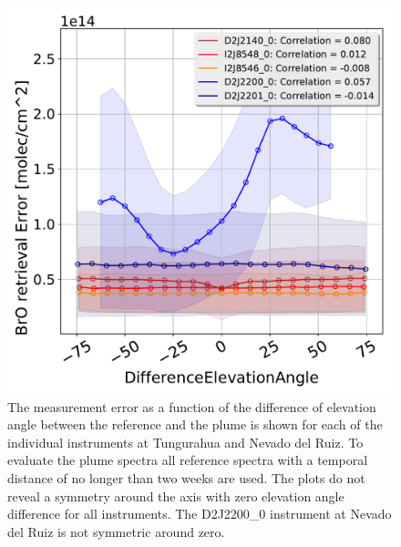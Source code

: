 \begin{figure}
    \centering
    \includegraphics[width=0.7\linewidth]{Bilder/DiffElevAngleallInstruments}
    \caption[The  measurement error as a function of the difference of elevation angle. Data of Tungurahua and Nevado del Ruiz]{The  measurement error as a function of the difference of elevation angle between the reference and the plume is shown for each of the individual instruments at Tungurahua and Nevado del Ruiz. To evaluate the plume spectra all reference spectra with a temporal distance of no longer than two weeks are used. The plots do not reveal a symmetry around the axis with zero elevation angle difference for all instruments. The D2J2200\_0 instrument at Nevado del Ruiz is not symmetric around zero.}
    \label{fig:diffeleangle}
\end{figure}
\begin{table}[h]
    \centering    
    \caption[Results of the fit of the  measurement error as a function of the difference of elevation angle between the reference and the plume. Data from Tungurahua and Nevado del Ruiz.]{The  measurement error as a function of the difference of elevation angle between the reference and the plume is fitted with a first-order polynomial for each of the individual instruments at Tungurahua and Nevado del Ruiz. This table shows the fitting parameters slope and intercept. Moreover, the correlation between the  error and the absolute elevation angle difference is shown. }

\end{table}
